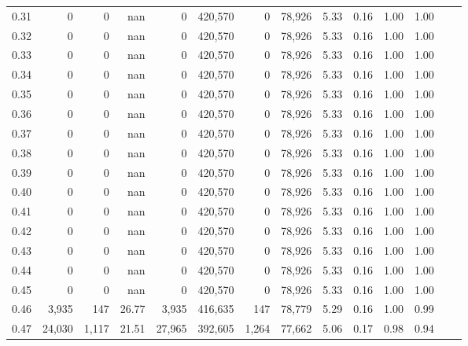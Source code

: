 \begin{tabular}{rrrrrrrrrrrrrr}
0.31 &        0 &       0 &     nan &        0 &  420,570 &       0 &  78,926 &  5.33 &  0.16 &  1.00 &      1.00 \\
0.32 &        0 &       0 &     nan &        0 &  420,570 &       0 &  78,926 &  5.33 &  0.16 &  1.00 &      1.00 \\
0.33 &        0 &       0 &     nan &        0 &  420,570 &       0 &  78,926 &  5.33 &  0.16 &  1.00 &      1.00 \\
0.34 &        0 &       0 &     nan &        0 &  420,570 &       0 &  78,926 &  5.33 &  0.16 &  1.00 &      1.00 \\
0.35 &        0 &       0 &     nan &        0 &  420,570 &       0 &  78,926 &  5.33 &  0.16 &  1.00 &      1.00 \\
0.36 &        0 &       0 &     nan &        0 &  420,570 &       0 &  78,926 &  5.33 &  0.16 &  1.00 &      1.00 \\
0.37 &        0 &       0 &     nan &        0 &  420,570 &       0 &  78,926 &  5.33 &  0.16 &  1.00 &      1.00 \\
0.38 &        0 &       0 &     nan &        0 &  420,570 &       0 &  78,926 &  5.33 &  0.16 &  1.00 &      1.00 \\
0.39 &        0 &       0 &     nan &        0 &  420,570 &       0 &  78,926 &  5.33 &  0.16 &  1.00 &      1.00 \\
0.40 &        0 &       0 &     nan &        0 &  420,570 &       0 &  78,926 &  5.33 &  0.16 &  1.00 &      1.00 \\
0.41 &        0 &       0 &     nan &        0 &  420,570 &       0 &  78,926 &  5.33 &  0.16 &  1.00 &      1.00 \\
0.42 &        0 &       0 &     nan &        0 &  420,570 &       0 &  78,926 &  5.33 &  0.16 &  1.00 &      1.00 \\
0.43 &        0 &       0 &     nan &        0 &  420,570 &       0 &  78,926 &  5.33 &  0.16 &  1.00 &      1.00 \\
0.44 &        0 &       0 &     nan &        0 &  420,570 &       0 &  78,926 &  5.33 &  0.16 &  1.00 &      1.00 \\
0.45 &        0 &       0 &     nan &        0 &  420,570 &       0 &  78,926 &  5.33 &  0.16 &  1.00 &      1.00 \\
0.46 &    3,935 &     147 &   26.77 &    3,935 &  416,635 &     147 &  78,779 &  5.29 &  0.16 &  1.00 &      0.99 \\
0.47 &   24,030 &   1,117 &   21.51 &   27,965 &  392,605 &   1,264 &  77,662 &  5.06 &  0.17 &  0.98 &      0.94 \\

\end{tabular}
